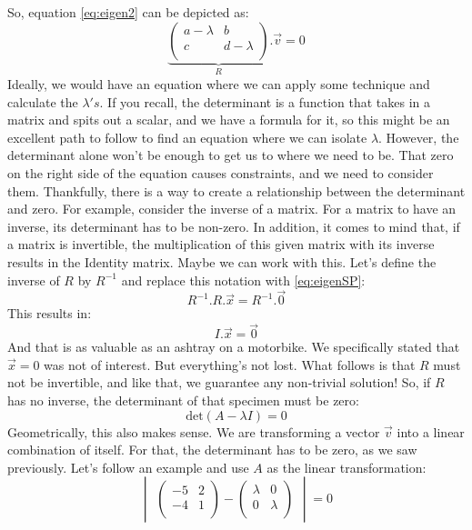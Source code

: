 \documentclass[600paper, 11pt,twoside,openany]{kdp}
\begin{document}
\indent So, equation \ref{eq:eigen2} can be depicted as:
\begin{equation}\label{eq:eigenSP}
\underbrace{\begin{pmatrix}
a - \lambda & b \\
c & d - \lambda \\
\end{pmatrix}}_{R}. \overrightarrow{v} = 0
\end{equation}
\indent 
Ideally, we would have an equation where we can apply some technique and calculate the $\lambda's$. If you recall, the determinant is a function that takes in a matrix and spits out a scalar, and we have a formula for it, so this might be an excellent path to follow to find an equation where we can isolate $\lambda$. However, the determinant alone won’t be enough to get us to where we need to be. That zero on the right side of the equation causes constraints, and we need to consider them. Thankfully, there is a way to create a relationship between the determinant and zero. For example, consider the inverse of a matrix. For a matrix to have an inverse, its determinant has to be non-zero. In addition, it comes to mind that, if a matrix is invertible, the multiplication of this given matrix with its inverse results in the Identity matrix. Maybe we can work with this. Let’s define the inverse of $R$ by $R^{−1}$ and replace this notation with \ref{eq:eigenSP}:
\[R^{-1}.R.\overrightarrow{x} = R^{-1}.\overrightarrow{0}\]
\indent This results in:
\[I.\overrightarrow{x} = \overrightarrow{0}\]
\indent And that is as valuable as an ashtray on a motorbike. We specifically stated that $\overrightarrow{x}=0$ was not of interest. But everything’s not lost. What follows is that $R$ must not be invertible, and like that, we guarantee any non-trivial solution! So, if $R$ has no inverse, the determinant of that specimen must be zero:
\[\textrm{det}(A - \lambda I) = 0 \]
\indent Geometrically, this also makes sense. We are transforming a vector $\overrightarrow{v}$ into a 
linear combination of itself. For that, the determinant has to be zero, as we saw previously. Let’s follow an example and use $A$ as the linear transformation:
\[\begin{vmatrix}\begin{pmatrix}
-5 & 2  \\
-4 & 1 \\
\end{pmatrix} - \begin{pmatrix}
\lambda & 0  \\
0 & \lambda  \\
\end{pmatrix} \end{vmatrix} = 0
\]
\end{document}
